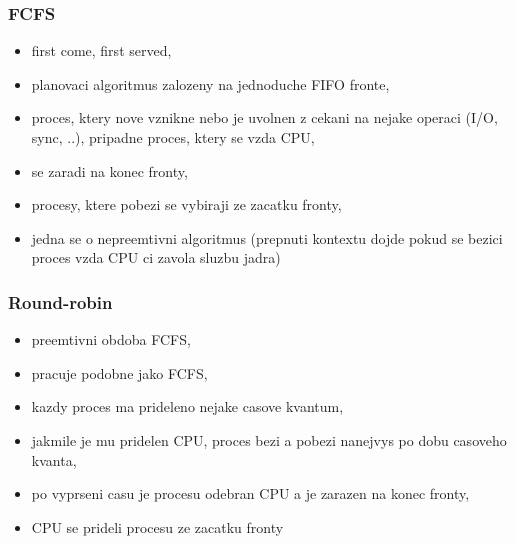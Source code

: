 \documentclass[a4paper, 11pt]{article}
\begin{document}
\subsubsection{FCFS}
\begin{itemize}
    \item first come, first served,
    \item planovaci algoritmus zalozeny na jednoduche FIFO fronte,
    \item proces, ktery nove vznikne nebo je uvolnen z cekani na nejake operaci (I/O, sync, ..), pripadne proces, ktery se vzda CPU,
    \item se zaradi na konec fronty,
    \item procesy, ktere pobezi se vybiraji ze zacatku fronty,
    \item jedna se o nepreemtivni algoritmus (prepnuti kontextu dojde pokud se bezici proces vzda CPU ci zavola sluzbu jadra) \\
\end{itemize}

\subsubsection{Round-robin}
\begin{itemize}
    \item preemtivni obdoba FCFS,
    \item pracuje podobne jako FCFS,
    \item kazdy proces ma prideleno nejake casove kvantum,
    \item jakmile je mu pridelen CPU, proces bezi a pobezi nanejvys po dobu casoveho kvanta,
    \item po vyprseni casu je procesu odebran CPU a je zarazen na konec fronty,
    \item CPU se prideli procesu ze zacatku fronty \\
\end{itemize}
\end{document}
